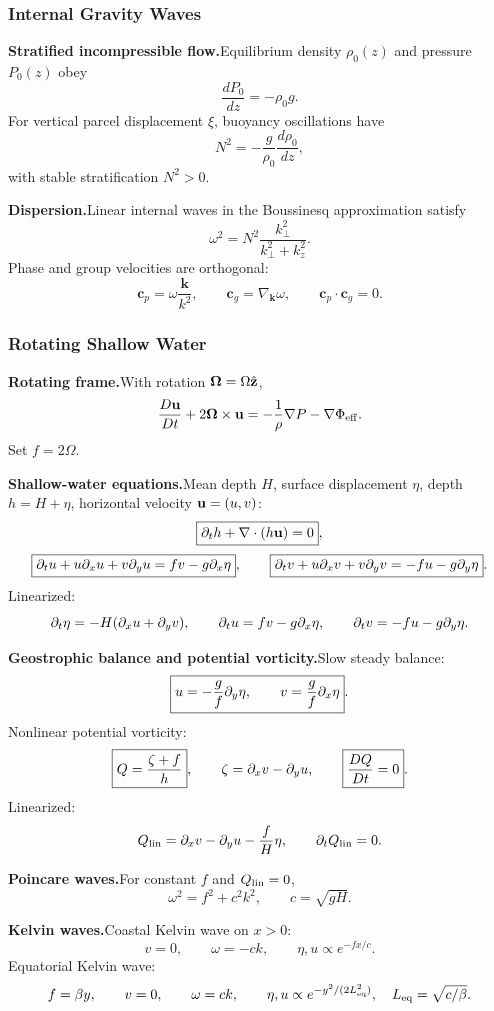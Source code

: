 \subsubsection*{Internal Gravity Waves}

\noindent\textbf{Stratified incompressible flow.}\quad Equilibrium density $\rho_0(z)$ and pressure $P_0(z)$ obey
\[
  \frac{dP_0}{dz}=-\rho_0g.
\]
For vertical parcel displacement $\xi$, buoyancy oscillations have
\[
  \boxed{N^2=-\frac{g}{\rho_0}\frac{d\rho_0}{dz}},
\]
with stable stratification $N^2>0$.

\noindent\textbf{Dispersion.}\quad Linear internal waves in the Boussinesq approximation satisfy
\[
  \boxed{\omega^2=N^2\frac{k_\perp^2}{k_\perp^2+k_z^2}}.
\]
Phase and group velocities are orthogonal:
\[
  \mathbf c_p=\omega\frac{\mathbf k}{k^2},
  \qquad
  \mathbf c_g=\nabla_\mathbf k\omega,
  \qquad
  \mathbf c_p\cdot\mathbf c_g=0.
\]

\subsubsection*{Rotating Shallow Water}

\noindent\textbf{Rotating frame.}\quad With rotation $\boldsymbol{\Omega}=\Omega\hat{\mathbf z}$,
\[
  \frac{D\mathbf{u}}{Dt}+2\boldsymbol{\Omega}\times\mathbf{u}
  =-\frac1\rho\nabla P-\nabla\Phi_{\rm eff}.
\]
Set $f=2\Omega$.

\noindent\textbf{Shallow-water equations.}\quad Mean depth $H$, surface displacement $\eta$, depth $h=H+\eta$, horizontal velocity $\mathbf{u}=(u,v)$:
\[
  \boxed{\partial_th+\nabla\cdot(h\mathbf{u})=0},
\]
\[
  \boxed{\partial_tu+u\partial_xu+v\partial_yu=fv-g\partial_x\eta},
  \qquad
  \boxed{\partial_tv+u\partial_xv+v\partial_yv=-fu-g\partial_y\eta}.
\]
Linearized:
\[
  \partial_t\eta=-H(\partial_xu+\partial_yv),\qquad
  \partial_tu=fv-g\partial_x\eta,\qquad
  \partial_tv=-fu-g\partial_y\eta.
\]

\noindent\textbf{Geostrophic balance and potential vorticity.}\quad Slow steady balance:
\[
  \boxed{u=-\frac{g}{f}\partial_y\eta,\qquad v=\frac{g}{f}\partial_x\eta}.
\]
Nonlinear potential vorticity:
\[
  \boxed{Q=\frac{\zeta+f}{h}},
  \qquad
  \zeta=\partial_xv-\partial_yu,
  \qquad
  \boxed{\frac{DQ}{Dt}=0}.
\]
Linearized:
\[
  Q_{\rm lin}=\partial_xv-\partial_yu-\frac{f}{H}\eta,
  \qquad
  \partial_tQ_{\rm lin}=0.
\]

\noindent\textbf{Poincare waves.}\quad For constant $f$ and $Q_{\rm lin}=0$,
\[
  \boxed{\omega^2=f^2+c^2k^2},
  \qquad c=\sqrt{gH}.
\]

\noindent\textbf{Kelvin waves.}\quad Coastal Kelvin wave on $x>0$:
\[
  v=0,\qquad
  \omega=-ck,\qquad
  \eta,u\propto e^{-fx/c}.
\]
Equatorial Kelvin wave:
\[
  f=\beta y,\qquad
  v=0,\qquad
  \omega=ck,\qquad
  \eta,u\propto e^{-y^2/(2L_{\rm eq}^2)},
  \quad
  L_{\rm eq}=\sqrt{c/\beta}.
\]

